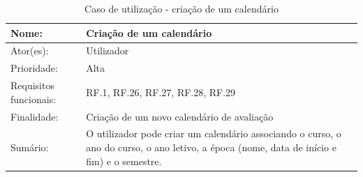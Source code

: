 \documentclass[11pt, twoside]{report}
\begin{document}
	
	
	
	\begin{table}[H]
		\caption{Caso de utilização - criação de um calendário}
		\label{usecasecriarcalendario}
		\begin{center}	
			\begin{tabularx}{\textwidth}{|l|X|}
				\hline
				\textbf{Nome: }             & \textbf{Criação de um calendário}                                                                                                                                                                                                                                                                                   \\
				\hline
				Ator(es):                   & Utilizador                                                                                                                                                                                                                                                                                                             \\
				\hline
				Prioridade:                 & Alta                                                                                                                                                                                                                                                                                                                   \\
				\hline
				Requisitos funcionais:      & RF.1, RF.26, RF.27, RF.28, RF.29                                                                                                                                                                                                                                                                                       \\
				\hline
				Finalidade:                 & Criação de um novo calendário de avaliação                                                                                                                                                                                                                                                                        \\
				\hline
				Sumário:                   & O utilizador pode criar um calendário associando o curso, o ano do curso, o ano letivo, a época (nome, data de início e fim) e o semestre.                                                                                                                                                                          \\

\end{tabularx}
\end{center}
\end{table}
\end{document}
